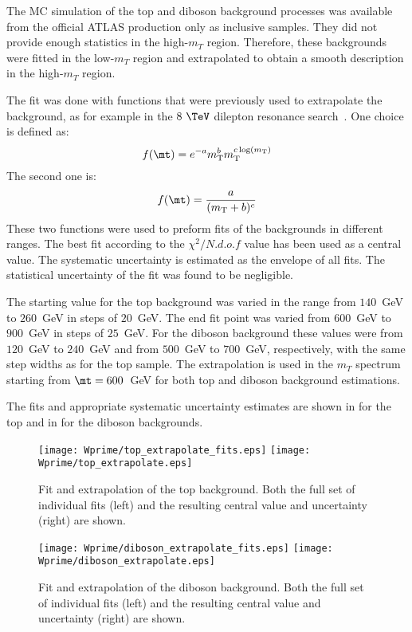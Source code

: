 The MC simulation of the top and diboson background processes was available from the official ATLAS production only as inclusive samples.
They did not provide enough statistics in the high-$m_T$ region.
Therefore, these backgrounds were fitted in the low-$m_T$ region and extrapolated to obtain a smooth description in the high-$m_T$ region.

The fit was done with functions that were previously used to extrapolate the background, as for example in the $8~\TeV$ dilepton resonance search~\cite{Aad:2014cka}.
One choice is defined as:
\begin{equation}
 f(\mt) = e^{-a} m_\mathrm{T}^{b} m_\mathrm{T}^{c \log(m_\mathrm{T})}
  \label{eq:dijetfunc}
\end{equation}
The second one is:
\begin{equation}
 f(\mt) = \frac{a}{(m_\mathrm{T}+b)^{c}}
  \label{eq:powerlaw}
\end{equation}
These two functions were used to preform fits of the backgrounds in different ranges. 
The best fit according to the $\chi^{2}/N.d.o.f$ value has been used as a central value.
The systematic uncertainty is estimated as the envelope of all fits.
The statistical uncertainty of the fit was found to be negligible.

The starting value for the top background was varied in the range from $140$~GeV to $260$~GeV in steps of $20$~GeV. The end fit point was varied from $600$~GeV to $900$~GeV in steps of $25$~GeV.
For the diboson background these values were from $120$~GeV to $240$~GeV and from $500$~GeV to $700$~GeV, respectively, with the same step widths as for the top sample.
The extrapolation is used in the $m_T$ spectrum starting from $\mt=600$~GeV for both top and diboson background estimations.

The fits and appropriate systematic uncertainty estimates are shown in 
 for the top and in  for the diboson backgrounds.
\begin{figure}[!htb]
  \centering
  \texttt{[image: Wprime/top\_extrapolate\_fits.eps]}
  \texttt{[image: Wprime/top\_extrapolate.eps]}
  \caption{Fit and extrapolation of the top background. Both the full set of individual
fits (left) and the resulting central value and uncertainty (right) are shown.}
  \label{fig:mu_extrapolate_top}
\end{figure}
\begin{figure}[!htb]
  \centering
  \texttt{[image: Wprime/diboson\_extrapolate\_fits.eps]}
  \texttt{[image: Wprime/diboson\_extrapolate.eps]}
  \caption{Fit and extrapolation of the diboson background. Both the full set of individual
fits (left) and the resulting central value and uncertainty (right) are shown.}
  \label{fig:mu_extrapolate_diboson}
\end{figure}

